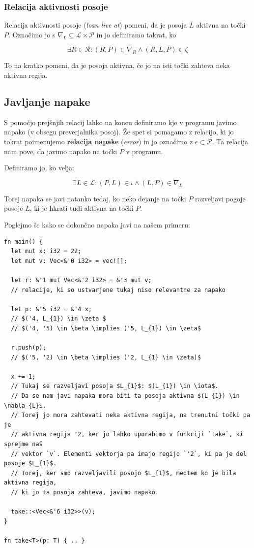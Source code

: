 \documentclass[a4paper,12pt,openright]{book}
\begin{document}
\subsubsection{Relacija aktivnosti posoje}

Relacija aktivnosti posoje (\textit{loan live at}) pomeni, da je posoja $L$ aktivna na točki $P$. Označimo jo s
$\nabla_{L} \subseteq \mathcal{L} \times \mathcal{P}$ in jo definiramo takrat, ko

\[ \exists R \in \mathcal{R}: (R,P) \in \nabla_{R} \land (R,L,P) \in \zeta \]

To na kratko pomeni, da je posoja aktivna, če jo na isti točki zahteva neka aktivna regija.

\subsection{Javljanje napake}

S pomočjo prejšnjih relacij lahko na koncu definiramo kje v programu javimo napako (v obsegu preverjalnika posoj).
Že spet si pomagamo z relacijo, ki jo tokrat poimenujemo \textbf{relacija napake} (\textit{error}) in jo označimo z
$\epsilon \subset \mathcal{P}$. Ta relacija nam pove, da javimo napako na točki $P$ v programu.

Definiramo jo, ko velja:

\[ \exists L \in \mathcal{L}: (P, L) \in \iota \land (L,P) \in \nabla_{L} \]

Torej napaka se javi natanko tedaj, ko neko dejanje na točki $P$ razveljavi pogoje posoje $L$, ki je hkrati tudi
aktivna na točki $P$.

Poglejmo še kako se dokončno napaka javi na našem primeru:

\begin{listing}[!ht]
	\begin{verbatim}
fn main() {
  let mut x: i32 = 22;
  let mut v: Vec<&'0 i32> = vec![];

  let r: &'1 mut Vec<&'2 i32> = &'3 mut v;
  // relacije, ki so ustvarjene tukaj niso relevantne za napako 

  let p: &'5 i32 = &'4 x;
  // $('4, L_{1}) \in \zeta $
  // $('4, '5) \in \beta \implies ('5, L_{1}) \in \zeta$

  r.push(p);
  // $('5, '2) \in \beta \implies ('2, L_{1} \in \zeta)$
  
  x += 1;
  // Tukaj se razveljavi posoja $L_{1}$: $(L_{1}) \in \iota$.
  // Da se nam javi napaka mora biti ta posoja aktivna $(L_{1}) \in \nabla_{L}$.
  // Torej jo mora zahtevati neka aktivna regija, na trenutni točki pa je 
  // aktivna regija '2, ker jo lahko uporabimo v funkciji `take`, ki sprejme naš 
  // vektor `v`. Elementi vektorja pa imajo regijo `'2`, ki pa je del posoje $L_{1}$.
  // Torej, ker smo razveljavili posojo $L_{1}$, medtem ko je bila aktivna regija,
  // ki jo ta posoja zahteva, javimo napako.

  take::<Vec<&'6 i32>>(v);
}

fn take<T>(p: T) { .. }
\end{verbatim}
	\caption{Napaka v programu}
	\label{listing:error}
\end{listing}
\end{document}
